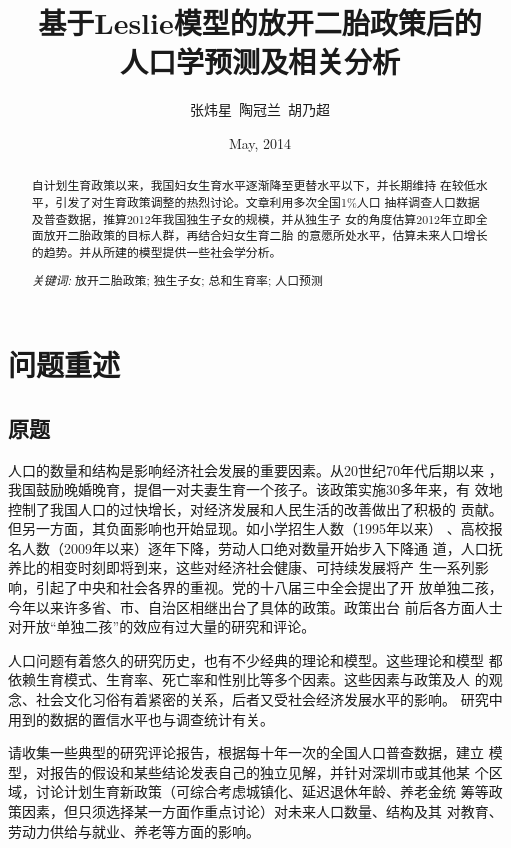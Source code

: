 \documentclass[a4paper]{article}
\title{基于Leslie模型的放开二胎政策后的\\人口学预测及相关分析}
\author{张炜星\, 陶冠兰\, 胡乃超}
\date{May, 2014}
\begin{document}
\maketitle
\begin{abstract}
自计划生育政策以来，我国妇女生育水平逐渐降至更替水平以下，并长期维持
在较低水平，引发了对生育政策调整的热烈讨论。文章利用多次全国1\%人口
抽样调查人口数据及普查数据，推算2012年我国独生子女的规模，并从独生子
女的角度估算2012年立即全面放开二胎政策的目标人群，再结合妇女生育二胎
的意愿所处水平，估算未来人口增长的趋势。并从所建的模型提供一些社会学分析。\par
\emph{关键词: }放开二胎政策; 独生子女; 总和生育率; 人口预测
\end{abstract}
\tableofcontents

\section{问题重述}
\subsection{原题}
人口的数量和结构是影响经济社会发展的重要因素。从20世纪70年代后期以来
，我国鼓励晚婚晚育，提倡一对夫妻生育一个孩子。该政策实施30多年来，有
效地控制了我国人口的过快增长，对经济发展和人民生活的改善做出了积极的
贡献。但另一方面，其负面影响也开始显现。如小学招生人数（1995年以来）
、高校报名人数（2009年以来）逐年下降，劳动人口绝对数量开始步入下降通
道，人口抚养比的相变时刻即将到来，这些对经济社会健康、可持续发展将产
生一系列影响，引起了中央和社会各界的重视。党的十八届三中全会提出了开
放单独二孩，今年以来许多省、市、自治区相继出台了具体的政策。政策出台
前后各方面人士对开放“单独二孩”的效应有过大量的研究和评论。\par
人口问题有着悠久的研究历史，也有不少经典的理论和模型。这些理论和模型
都依赖生育模式、生育率、死亡率和性别比等多个因素。这些因素与政策及人
的观念、社会文化习俗有着紧密的关系，后者又受社会经济发展水平的影响。
研究中用到的数据的置信水平也与调查统计有关。\par
请收集一些典型的研究评论报告，根据每十年一次的全国人口普查数据，建立
模型，对报告的假设和某些结论发表自己的独立见解，并针对深圳市或其他某
个区域，讨论计划生育新政策（可综合考虑城镇化、延迟退休年龄、养老金统
筹等政策因素，但只须选择某一方面作重点讨论）对未来人口数量、结构及其
对教育、劳动力供给与就业、养老等方面的影响。
\end{document}

